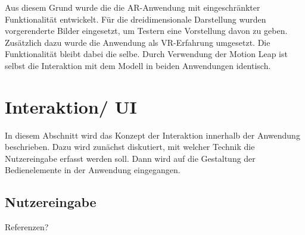 Aus diesem Grund wurde die die AR-Anwendung mit eingeschränkter Funktionalität entwickelt. Für die dreidimensionale Darstellung wurden vorgerenderte Bilder eingesetzt, um Testern eine Vorstellung davon zu geben.
Zusätzlich dazu wurde die Anwendung als VR-Erfahrung umgesetzt. Die Funktionalität bleibt dabei die selbe. 
Durch Verwendung der Motion Leap ist selbst die Interaktion mit dem Modell in beiden Anwendungen identisch. 



\section{Interaktion/ UI } 

In diesem Abschnitt wird das Konzept der Interaktion innerhalb der Anwendung beschrieben. Dazu wird zunächst diskutiert, mit welcher Technik die Nutzereingabe erfasst werden soll. Dann wird auf die Gestaltung der Bedienelemente in der Anwendung eingegangen.

\subsection{Nutzereingabe}
Referenzen?

